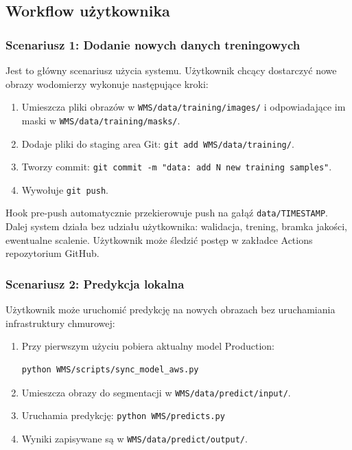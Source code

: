 \subsection{Workflow użytkownika}

\subsubsection{Scenariusz 1: Dodanie nowych danych treningowych}

Jest to główny scenariusz użycia systemu. Użytkownik chcący dostarczyć nowe obrazy wodomierzy wykonuje następujące kroki:

\begin{enumerate}
  \item Umieszcza pliki obrazów w \texttt{WMS/data/training/images/} i odpowiadające im maski w \texttt{WMS/data/training/masks/}.
  \item Dodaje pliki do staging area Git: \texttt{git add WMS/data/training/}.
  \item Tworzy commit: \texttt{git commit -m "data: add N new training samples"}.
  \item Wywołuje \texttt{git push}.
\end{enumerate}

Hook pre-push automatycznie przekierowuje push na gałąź \texttt{data/TIMESTAMP}. Dalej system działa bez udziału użytkownika: walidacja, trening, bramka jakości, ewentualne scalenie. Użytkownik może śledzić postęp w zakładce Actions repozytorium GitHub.

\subsubsection{Scenariusz 2: Predykcja lokalna}

Użytkownik może uruchomić predykcję na nowych obrazach bez uruchamiania infrastruktury chmurowej:

\begin{enumerate}
  \item Przy pierwszym użyciu pobiera aktualny model Production:
        \begin{lstlisting}[numbers=none,frame=none,backgroundcolor=\color{white},basicstyle=\ttfamily\small,xleftmargin=0pt]
python WMS/scripts/sync_model_aws.py
\end{lstlisting}
  \item Umieszcza obrazy do segmentacji w \texttt{WMS/data/predict/input/}.
  \item Uruchamia predykcję: \texttt{python WMS/predicts.py}
  \item Wyniki zapisywane są w \texttt{WMS/data/predict/output/}.
\end{enumerate}

